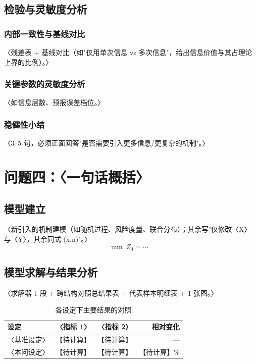 \documentclass[12pt,a4paper]{ctexart}
\newif\ifwritemode
\newcommand{\ph}[1][待计算]{\textcolor{phred}{【#1】}}
\newcommand{\guide}[1]{%
  \ifwritemode\par\noindent{\small\color{guideblue}\textbf{【写作提示】}#1}\par\fi}
\newcommand{\tabhead}[1]{\textbf{#1}}
\begin{document}
\subsection{检验与灵敏度分析}
\subsubsection{内部一致性与基线对比}
〈残差表 + 基线对比（如"仅用单次信息 vs 多次信息"，给出信息价值与其占理论上界的比例）。〉
\subsubsection{关键参数的灵敏度分析}
〈如信息层数、预报误差档位。〉
\subsubsection{稳健性小结}
〈3–5 句，必须正面回答"是否需要引入更多信息/更复杂的机制"。〉

\section{问题四：〈一句话概括〉}\label{sec:q4}
\guide{本问常是前几问在更一般设定下的重算：把"重算"写成"同一模型族更换〈某开关〉"，差异点逐条列出，篇幅可以最短，但三段式不可省。}

\subsection{模型建立}
〈新引入的机制建模（如随机过程、风险度量、联合分布）；其余写"仅修改〈X〉与〈Y〉，其余同式 (x.n)"。〉
\begin{equation}\label{eq:q4-obj}
  \min\ Z_4=\cdots
\end{equation}

\subsection{模型求解与结果分析}
〈求解器 1 段 + 跨结构对照总结果表 + 代表样本明细表 + 1 张图。〉
\begin{table}[htbp]\centering\small
  \caption{各设定下主要结果的对照}\label{tab:q4-main}
  \begin{tabular}{lrrr}
    \toprule
    \tabhead{设定} & \tabhead{〈指标 1〉} & \tabhead{〈指标 2〉} & \tabhead{相对变化} \\
    \midrule
    〈基准设定〉 & \ph & \ph & — \\
    〈本问设定〉 & \ph & \ph & \ph\% \\
    \bottomrule
  \end{tabular}
\end{table}
\end{document}

